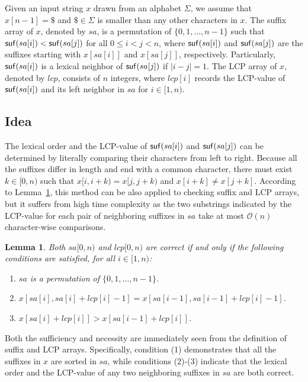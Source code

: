 \documentclass[10pt,journal,compsoc]{IEEEtran}
\newtheorem{Lemma}{Lemma}
\begin{document}
Given an input string $x$ drawn from an alphabet $\Sigma$, we assume that $x[n - 1] = \$$ and $\$ \in \Sigma$ is smaller than any other characters in $x$. The suffix array of $x$, denoted by $sa$, is a permutation of $\{0, 1, ..., n - 1\}$ such that ${\sf suf}(sa[i]) < {\sf suf}(sa[j])$ for all $0 \le i < j < n$, where ${\sf suf}(sa[i])$ and ${\sf suf}(sa[j])$ are the suffixes starting with $x[sa[i]]$ and $x[sa[j]]$, respectively. Particularly, ${\sf suf}(sa[i])$ is a lexical neighbor of ${\sf suf}(sa[j])$ if $|i - j| = 1$. The LCP array of $x$, denoted by $lcp$, consists of $n$ integers, where $lcp[i]$ records the LCP-value of ${\sf suf}(sa[i])$ and its left neighbor in $sa$ for $i \in [1, n)$. 


\subsection{Idea} \label{sec:method1:idea}

The lexical order and the LCP-value of ${\sf suf}(sa[i])$ and ${\sf suf}(sa[j])$ can be determined by literally comparing their characters from left to right. Because all the suffixes differ in length and end with a common character, there must exist $k \in [0, n)$ such that $x[i, i + k) = x[j, j + k)$ and $x[i + k] \ne x[j + k]$. According to Lemma~\ref{lemma:1}, this method can be also applied to checking suffix and LCP arrays, but it suffers from high time complexity as the two substrings indicated by the LCP-value for each pair of neighboring suffixes in $sa$ take at most $\mathcal{O}(n)$ character-wise comparisons.

\begin{Lemma} \label{lemma:1}
	Both $sa[0, n)$ and $lcp[0, n)$ are correct if and only if the following conditions are satisfied, for all $i \in [1, n)$:
	\begin{enumerate}[(1)]
		\item
		$sa$ is a permutation of $\{0, 1, \dots, n - 1\}$.
		\item
		$x[sa[i], sa[i] + lcp[i] - 1] = x[sa[i - 1], sa[i - 1] + lcp[i] - 1]$.
		\item
		$x[sa[i] + lcp[i]] > x[sa[i - 1] + lcp[i]]$. 	
	\end{enumerate}
\end{Lemma}

\begin{IEEEproof}
	Both the sufficiency and necessity are immediately seen from the definition of suffix and LCP arrays. Specifically, condition (1) demonstrates that all the suffixes in $x$ are sorted in $sa$, while conditions (2)-(3) indicate that the lexical order and the LCP-value of any two neighboring suffixes in $sa$ are both correct.
\end{IEEEproof}
\end{document}
